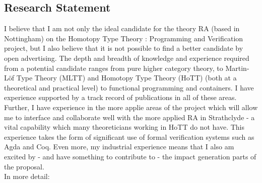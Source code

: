 \documentclass[a4paper]{article}
\newcommand{\project}{Homotopy Type Theory : Programming and Verification}
\newcommand{\mltt}{MLTT}
\begin{document}
\subsection*{Research Statement}
I believe that I am not only the ideal candidate for the theory RA
(based in Nottingham) on the {\project} project, but I also believe
that it is not possible to find a better candidate by open
advertising. The depth and breadth of knowledge and experience
required from a potential candidate ranges from pure higher category
theory, to Martin-L\"of Type Theory ({\mltt}) and Homotopy Type Theory
(HoTT) (both at a theoretical and practical level) to functional
programming and containers. I have experience supported by a track
record of publications in all of these areas. Further, I have
experience in the more applie areas of the project which will allow me
to interface and collaborate well with the more applied RA in
Strathclyde - a vital capability which many theoreticians working in
HoTT do not have. This experience takes the form of significant use of
formal verification systems such as Agda and Coq. Even more, my
industrial experience means that I also am excited by - and have
something to contribute to - the impact generation parts of the
proposal. \\[1ex]

\noindent In more detail:


\end{document}
